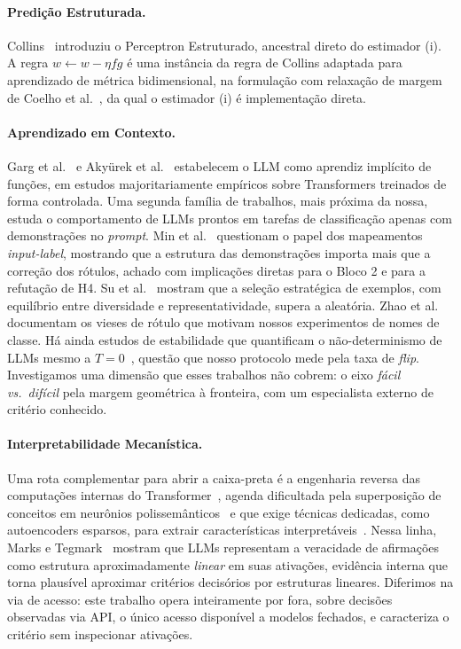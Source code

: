 \documentclass[12pt,a4paper]{article}
\begin{document}
\paragraph{Predição Estruturada.}
Collins~\cite{collinsDiscriminativeTraining2002} introduziu o Perceptron Estruturado,
ancestral direto do estimador (i). A regra $w \leftarrow w - \eta f g$ é uma instância da
regra de Collins adaptada para aprendizado de métrica bidimensional, na formulação com
relaxação de margem de Coelho et al.~\cite{coelhoPredicaoEstruturada2017}, da qual o
estimador (i) é implementação direta.

\paragraph{Aprendizado em Contexto.}
Garg et al.~\cite{gargWhatTransformers2022} e Akyürek et al.~\cite{akyurekWhatLearning2023}
estabelecem o LLM como aprendiz implícito de funções, em estudos majoritariamente
empíricos sobre Transformers treinados de forma controlada. Uma segunda família de
trabalhos, mais próxima da nossa, estuda o comportamento de LLMs prontos em tarefas de
classificação apenas com demonstrações no \emph{prompt}. Min et
al.~\cite{minRethinkingRole2022} questionam o papel dos mapeamentos \emph{input-label},
mostrando que a estrutura das demonstrações importa mais que a correção dos rótulos, achado
com implicações diretas para o Bloco 2 e para a refutação de H4. Su et
al.~\cite{suSelectiveAnnotation2023} mostram que a seleção estratégica de exemplos, com
equilíbrio entre diversidade e representatividade, supera a aleatória. Zhao et
al.~\cite{zhaoCalibrateBefore2021} documentam os vieses de rótulo que motivam nossos
experimentos de nomes de classe. Há ainda estudos de estabilidade que quantificam o
não-determinismo de LLMs mesmo a $T=0$~\cite{atilLLMStability2024, windischOneRun2026},
questão que nosso protocolo mede pela taxa de \emph{flip}. Investigamos uma
dimensão que esses trabalhos não cobrem: o eixo \emph{fácil vs.\ difícil} pela margem
geométrica à fronteira, com um especialista externo de critério conhecido.

\paragraph{Interpretabilidade Mecanística.}
Uma rota complementar para abrir a caixa-preta é a engenharia reversa das computações
internas do Transformer~\cite{elhageMathematicalFramework2021}, agenda dificultada pela
superposição de conceitos em neurônios polissemânticos~\cite{elhageToyModels2022} e que
exige técnicas dedicadas, como autoencoders esparsos, para extrair características
interpretáveis~\cite{brickenMonosemanticity2023}. Nessa linha, Marks e
Tegmark~\cite{marksGeometryTruth2024} mostram que LLMs representam a veracidade de
afirmações como estrutura aproximadamente \emph{linear} em suas ativações, evidência
interna que torna plausível aproximar critérios decisórios por estruturas lineares.
Diferimos na via de acesso: este trabalho opera inteiramente por fora, sobre decisões
observadas via API, o único acesso disponível a modelos fechados, e caracteriza o critério
sem inspecionar ativações.
\end{document}
